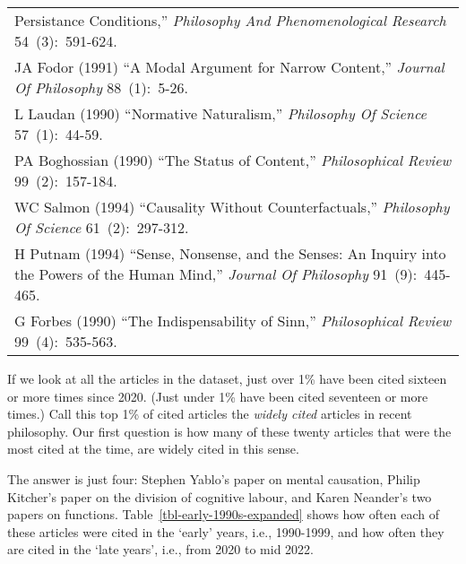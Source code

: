 \documentclass[
  10pt,
  letterpaper,
  DIV=11,
  numbers=noendperiod,
  twoside]{scrartcl}
\begin{document}
\begin{longtable}[]{@{}
  >{\raggedright\arraybackslash}p{}@{}}
Persistance Conditions,'' \emph{Philosophy And Phenomenological
Research} 54~(3):~591-624. \\
JA Fodor (1991) ``A Modal Argument for Narrow Content,'' \emph{Journal
Of Philosophy} 88~(1):~5-26. \\
L Laudan (1990) ``Normative Naturalism,'' \emph{Philosophy Of Science}
57~(1):~44-59. \\
PA Boghossian (1990) ``The Status of Content,'' \emph{Philosophical
Review} 99~(2):~157-184. \\
WC Salmon (1994) ``Causality Without Counterfactuals,'' \emph{Philosophy
Of Science} 61~(2):~297-312. \\
H Putnam (1994) ``Sense, Nonsense, and the Senses: An Inquiry into the
Powers of the Human Mind,'' \emph{Journal Of Philosophy}
91~(9):~445-465. \\
G Forbes (1990) ``The Indispensability of Sinn,'' \emph{Philosophical
Review} 99~(4):~535-563. \\

\end{longtable}

If we look at all the articles in the dataset, just over 1\% have been
cited sixteen or more times since 2020. (Just under 1\% have been cited
seventeen or more times.) Call this top 1\% of cited articles the
\emph{widely cited} articles in recent philosophy. Our first question is
how many of these twenty articles that were the most cited at the time,
are widely cited in this sense.

The answer is just four: Stephen Yablo's paper on mental causation,
Philip Kitcher's paper on the division of cognitive labour, and Karen
Neander's two papers on functions. Table~\ref{tbl-early-1990s-expanded}
shows how often each of these articles were cited in the `early' years,
i.e., 1990-1999, and how often they are cited in the `late years', i.e.,
from 2020 to mid 2022.
\end{document}
